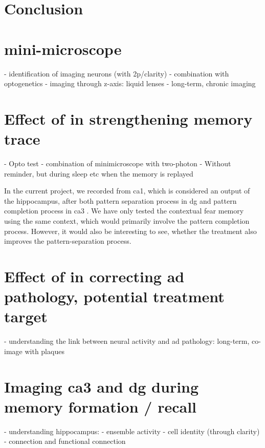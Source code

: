 \section{Conclusion}

\section{mini-microscope}
- identification of imaging neurons (with 2p/clarity)
- combination with optogenetics
- imaging through z-axis: liquid lenses
- long-term, chronic imaging

\section{Effect of \tglu in strengthening memory trace}
- Opto test - combination of minimicroscope with two-photon
- Without reminder, but during sleep etc when the memory is replayed

In the current project, we recorded from \gls{ca1}, which is considered an output of the hippocampus, after both pattern separation process in \gls{dg} and pattern completion process in \gls{ca3} . We have only tested the contextual fear memory using the same context, which would primarily involve the pattern completion process. However, it would also be interesting to see, whether the \tglu treatment also improves the pattern-separation process. \citet{migues16} 

\section{Effect of \tglu in correcting \gls{ad} pathology, potential treatment target}
- understanding the link between neural activity and ad pathology:
    long-term, co-image with plaques

\section{Imaging \gls{ca3} and \gls{dg} during memory formation / recall}
- understanding hippocampus:
    - ensemble activity
    - cell identity (through clarity)
    - connection and functional connection







